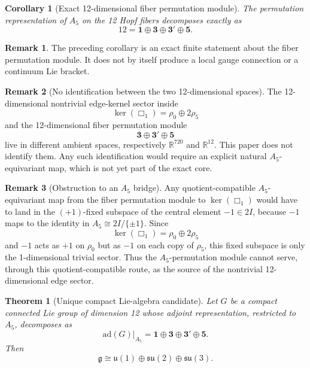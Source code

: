\documentclass[12pt,a4paper]{article}
\newtheorem{theorem}{Theorem}
\newtheorem{corollary}{Corollary}
\theoremstyle{definition}
\newtheorem{remark}{Remark}
\begin{document}
\begin{corollary}[Exact 12-dimensional fiber permutation module]
\label{cor:fiber_perm_exact}
The permutation representation of $A_5$ on the 12 Hopf fibers decomposes exactly as
\begin{equation}
12=\mathbf{1}\oplus \mathbf{3}\oplus \mathbf{3'}\oplus \mathbf{5}.
\end{equation}
\end{corollary}

\begin{remark}
The preceding corollary is an exact finite statement about the fiber permutation module.  It does not by itself produce a local gauge connection or a continuum Lie bracket.
\end{remark}

\begin{remark}[No identification between the two 12-dimensional spaces]
The 12-dimensional nontrivial edge-kernel sector inside
\[
\ker(\Box_1)=\rho_0\oplus 2\rho_5
\]
and the 12-dimensional fiber permutation module
\[
\mathbf{3}\oplus \mathbf{3'}\oplus \mathbf{5}
\]
live in different ambient spaces, respectively $\mathbb{R}^{720}$ and
$\mathbb{R}^{12}$.  This paper does not identify them.  Any such
identification would require an explicit natural $A_5$-equivariant map, which
is not yet part of the exact core.
\end{remark}

\begin{remark}[Obstruction to an \texorpdfstring{$A_5$}{A5} bridge]
Any quotient-compatible $A_5$-equivariant map from the fiber permutation module
to $\ker(\Box_1)$ would have to land in the $(+1)$-fixed subspace of the
central element $-1\in 2I$, because $-1$ maps to the identity in
$A_5\cong 2I/\{\pm1\}$. Since
\[
\ker(\Box_1)=\rho_0\oplus 2\rho_5
\]
and $-1$ acts as $+1$ on $\rho_0$ but as $-1$ on each copy of $\rho_5$, this
fixed subspace is only the 1-dimensional trivial sector. Thus the
$A_5$-permutation module cannot serve, through this quotient-compatible route,
as the source of the nontrivial 12-dimensional edge sector.
\end{remark}

\begin{theorem}[Unique compact Lie-algebra candidate]
\label{thm:gauge_candidate_exact}
Let $G$ be a compact connected Lie group of dimension 12 whose adjoint representation, restricted to $A_5$, decomposes as
\begin{equation}
\mathrm{ad}(G)\big|_{A_5}=\mathbf{1}\oplus \mathbf{3}\oplus \mathbf{3'}\oplus \mathbf{5}.
\end{equation}
Then
\begin{equation}
\mathfrak{g}\cong \mathfrak{u}(1)\oplus \mathfrak{su}(2)\oplus \mathfrak{su}(3).
\end{equation}
\end{theorem}
\end{document}
